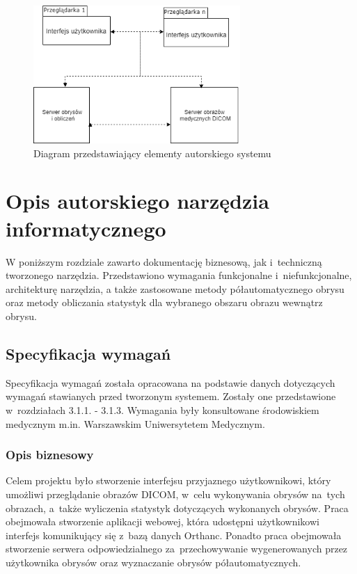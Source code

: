 \documentclass[a4paper,11pt,twoside,openright]{report}
\newcommand\blankpage{%
    \null
    \thispagestyle{empty}%
    \newpage}
\theoremstyle{definition}
\begin{document}
\begin{figure}[tb]
	\center
	\includegraphics[width=0.7\textwidth]{architektura2}
	\caption{Diagram przedstawiający elementy autorskiego systemu}
    	\label{fig:architektura2} %
\end{figure}

\afterpage{\blankpage}

\chapter {Opis autorskiego narzędzia informatycznego}

W poniższym rozdziale zawarto dokumentację biznesową, jak i~techniczną tworzonego narzędzia.
Przedstawiono wymagania funkcjonalne i~niefunkcjonalne,
architekturę narzędzia, a także zastosowane metody półautomatycznego obrysu oraz metody obliczania
statystyk dla wybranego obszaru obrazu wewnątrz obrysu.

\section {Specyfikacja wymagań}

Specyfikacja wymagań została opracowana na podstawie danych dotyczących wymagań stawianych
przed tworzonym systemem. Zostały one przedstawione w~rozdziałach 3.1.1. - 3.1.3. Wymagania
były konsultowane %
środowiskiem medycznym m.in. Warszawskim Uniwersytetem Medycznym.

\subsection {Opis biznesowy}

Celem projektu było stworzenie interfejsu przyjaznego użytkownikowi, który umożliwi
przeglądanie obrazów DICOM, w~celu wykonywania obrysów na~tych obrazach, a~także wyliczenia
statystyk dotyczących wykonanych obrysów. Praca
obejmowała stworzenie aplikacji webowej, która udostępni użytkownikowi interfejs
komunikujący się z~bazą danych Orthanc. Ponadto praca obejmowała stworzenie serwera
odpowiedzialnego za~przechowywanie wygenerowanych przez użytkownika obrysów oraz
wyznaczanie obrysów półautomatycznych.
\end{document}
